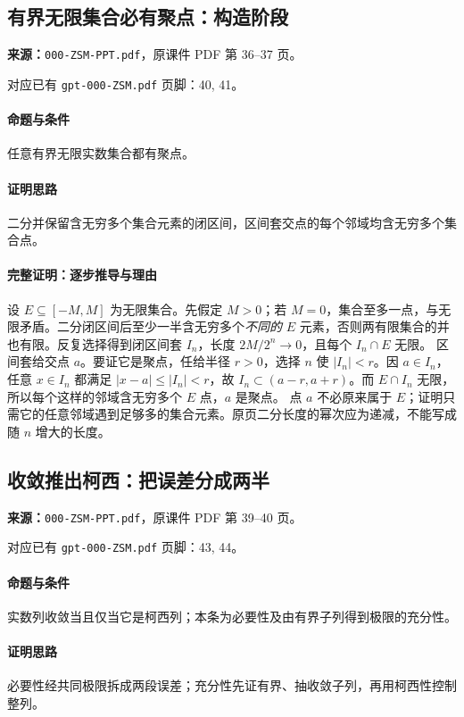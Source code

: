 \clearpage\subsection{有界无限集合必有聚点：构造阶段}
\textbf{来源：}\texttt{000-ZSM-PPT.pdf}，原课件 PDF 第 36--37 页。\par
对应已有 \texttt{gpt-000-ZSM.pdf} 页脚：40, 41。\par
\paragraph{命题与条件}任意有界无限实数集合都有聚点。
\paragraph{证明思路}二分并保留含无穷多个集合元素的闭区间，区间套交点的每个邻域均含无穷多个集合点。
\paragraph{完整证明：逐步推导与理由}

设 $E\subseteq[-M,M]$ 为无限集合。先假定 $M>0$；若 $M=0$，集合至多一点，与无限矛盾。二分闭区间后至少一半含无穷多个\emph{不同的} $E$ 元素，否则两有限集合的并也有限。反复选择得到闭区间套 $I_n$，长度 $2M/2^n\to0$，且每个 $I_n\cap E$ 无限。
区间套给交点 $a$。要证它是聚点，任给半径 $r>0$，选择 $n$ 使 $|I_n|<r$。因 $a\in I_n$，任意 $x\in I_n$ 都满足 $|x-a|\le|I_n|<r$，故 $I_n\subset(a-r,a+r)$。而 $E\cap I_n$ 无限，所以每个这样的邻域含无穷多个 $E$ 点，$a$ 是聚点。
点 $a$ 不必原来属于 $E$；证明只需它的任意邻域遇到足够多的集合元素。原页二分长度的幂次应为递减，不能写成随 $n$ 增大的长度。

\clearpage\subsection{收敛推出柯西：把误差分成两半}
\textbf{来源：}\texttt{000-ZSM-PPT.pdf}，原课件 PDF 第 39--40 页。\par
对应已有 \texttt{gpt-000-ZSM.pdf} 页脚：43, 44。\par
\paragraph{命题与条件}实数列收敛当且仅当它是柯西列；本条为必要性及由有界子列得到极限的充分性。
\paragraph{证明思路}必要性经共同极限拆成两段误差；充分性先证有界、抽收敛子列，再用柯西性控制整列。
